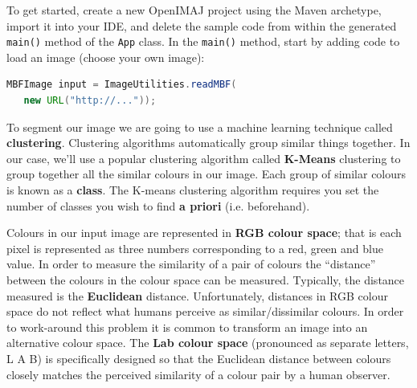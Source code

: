 \documentclass[10pt,a4paper,twoside,extrafontsizes]{memoir}
\begin{document}
To get started, create a new OpenIMAJ project using the Maven archetype, 
import it into your IDE, and delete the sample code from within the generated 
\verb+main()+ method of the \verb+App+ class. In the \verb+main()+ method, 
start by adding code to load an image (choose your own image):
\begin{lstlisting}[language=java]
MBFImage input = ImageUtilities.readMBF(
   new URL("http://..."));
\end{lstlisting}

To segment our image we are going to use a machine 
learning technique called 
\textbf{clustering}. Clustering algorithms automatically group similar things together. In our 
case, we'll use a popular clustering algorithm called \textbf{K-Means} clustering to group 
together all the similar colours in our image. Each group of similar colours is 
known as a \textbf{class}. The K-means clustering algorithm requires you set the number 
of classes you wish to find \textbf{a priori} (i.e. beforehand). 

Colours in our input image are represented in \textbf{RGB colour space}; that is each pixel is 
represented as three numbers corresponding to a red, green and blue value. In order 
to measure the similarity of a pair of colours the ``distance'' between the colours in 
the colour space can be measured.  Typically, the distance measured is the \textbf{Euclidean} 
distance. Unfortunately, distances in RGB colour space do not reflect what humans perceive as 
similar/dissimilar colours. In order to work-around this problem it is common to transform 
an image into an alternative colour space. The \textbf{Lab colour space} (pronounced as 
separate letters, L A B) is specifically designed so that the Euclidean distance between 
colours closely matches the perceived similarity of a colour pair by a human observer.
\end{document}
